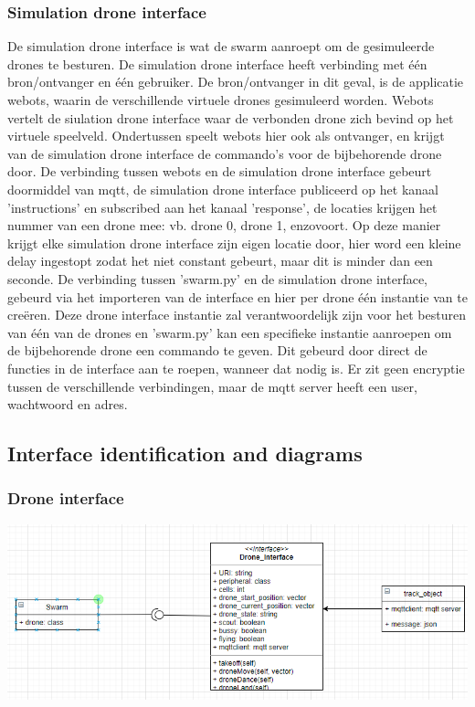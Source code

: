 \subsubsection{Simulation drone interface}
De simulation drone interface is wat de swarm aanroept om de gesimuleerde drones te besturen. De simulation drone interface heeft verbinding met één bron/ontvanger en één gebruiker. De bron/ontvanger in dit geval, is de applicatie webots, waarin de verschillende virtuele drones gesimuleerd worden. Webots vertelt de siulation drone interface waar de verbonden drone zich bevind op het virtuele speelveld. Ondertussen speelt webots hier ook als ontvanger, en krijgt van de simulation drone interface de commando's voor de bijbehorende drone door.
De verbinding tussen webots en de simulation drone interface gebeurt doormiddel van mqtt, de simulation drone interface publiceerd op het kanaal 'instructions' en subscribed aan het kanaal 'response', de locaties krijgen het nummer van een drone mee: vb. drone 0, drone 1, enzovoort. Op deze manier krijgt elke simulation drone interface zijn eigen locatie door, hier word een kleine delay ingestopt zodat het niet constant gebeurt, maar dit is minder dan een seconde.
De verbinding tussen 'swarm.py' en de simulation drone interface, gebeurd via het importeren van de interface en hier per drone één instantie van te creëren. Deze drone interface instantie zal verantwoordelijk zijn voor het besturen van één van de drones en 'swarm.py' kan een specifieke instantie aanroepen om de bijbehorende drone een commando te geven. Dit gebeurd door direct de functies in de interface aan te roepen, wanneer dat nodig is. Er zit geen encryptie tussen de verschillende verbindingen, maar de mqtt server heeft een user, wachtwoord en adres.

\subsection{Interface identification and diagrams}
\subsubsection{Drone interface}
\includegraphics[width=\textwidth]{Latex/TECHDOCUMENT/drone_interface.PNG}
